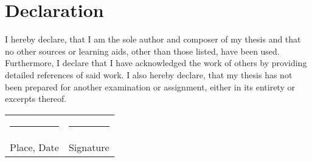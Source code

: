 
\chapter*{Declaration}

I hereby declare, that I am the sole author and composer of my thesis and that no other sources or learning aids, other than those listed, have been used.
Furthermore, I declare that I have acknowledged the work of others by providing detailed references of said work.  \newline
I also hereby declare, that my thesis has not been prepared for another examination or assignment, either in its entirety or excerpts thereof.
\\[3\normalbaselineskip]
\begin{tabular}{p{} l}
  \rule{\textwidth/3}{0.4pt}   &   \rule{\textwidth/3}{0.4pt} \\
  Place, Date                  &   Signature
\end{tabular}
